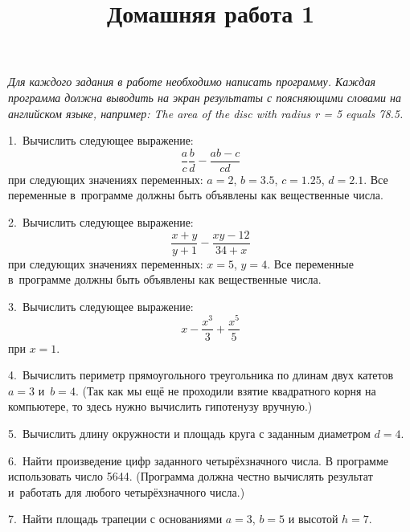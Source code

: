 \documentclass[12pt,russian,draft]{article}
\title{Домашняя работа 1}
\date{}
\begin{document}
\maketitle{}

\emph{Для каждого задания в работе необходимо написать программу. Каждая программа
должна выводить на экран результаты с поясняющими словами на английском
языке, например: The area of the disc with radius r = 5 equals 78.5.}

1.\ Вычислить следующее выражение:
\[
    \frac{a}{c} \frac{b}{d} - \frac{ab - c}{cd}
\]
при следующих значениях переменных: $ a = 2 $, $ b = 3.5 $, $ c = 1.25 $,
$ d = 2.1 $. Все переменные в~программе должны быть объявлены как вещественные
числа.

2.\ Вычислить следующее выражение:
\[
    \frac{x + y}{y + 1} - \frac{xy - 12}{34 + x}
\]
при следующих значениях переменных: $ x = 5 $, $ y = 4 $. Все переменные
в~программе должны быть объявлены как вещественные числа.

3.\ Вычислить следующее выражение:
\[
    x - \frac{x^3}{3} + \frac{x^5}{5}
\]
при $ x = 1 $.

4.\ Вычислить периметр прямоугольного треугольника по длинам двух катетов
$ a = 3 $ и~$ b = 4 $. (Так как мы ещё не проходили взятие квадратного корня
на компьютере, то здесь нужно вычислить гипотенузу вручную.)

5.\ Вычислить длину окружности и площадь круга с заданным диаметром $ d = 4 $.

6.\ Найти произведение цифр заданного четырёхзначного числа. В программе
использо\-вать число 5644. (Программа должна честно вычислять результат
и~работать для любого четырёх\-значного числа.)

7.\ Найти площадь трапеции с основаниями $ a = 3 $, $ b = 5 $ и высотой
$ h = 7 $.
\end{document}
